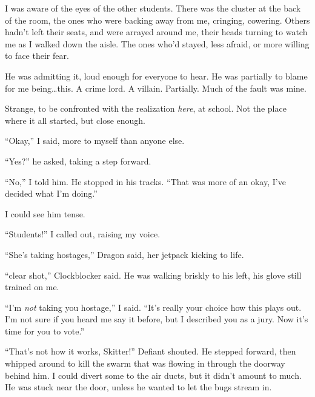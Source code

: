 I was aware of the eyes of the other students.  There was the cluster at the back of the room, the ones who were backing away from me, cringing, cowering.  Others hadn't left their seats, and were arrayed around me, their heads turning to watch me as I walked down the aisle.  The ones who'd stayed, less afraid, or more willing to face their fear.



He was admitting it, loud enough for everyone to hear.  He was partially to blame for me being\ldots this.  A crime lord.  A villain.  Partially.  Much of the fault was mine.



Strange, to be confronted with the realization \emph{here}, at school.  Not the place where it all started, but close enough.



``Okay,'' I said, more to myself than anyone else.



``Yes?'' he asked, taking a step forward.



``No,'' I told him.  He stopped in his tracks.  ``That was more of an okay, I've decided what I'm doing.''



I could see him tense.



``Students!'' I called out, raising my voice.



``She's taking hostages,'' Dragon said, her jetpack kicking to life.



``\ldotsa clear shot,'' Clockblocker said.  He was walking briskly to his left, his glove still trained on me.



``I'm \emph{not} taking you hostage,'' I said.  ``It's really your choice how this plays out.  I'm not sure if you heard me say it before, but I described you as a jury.  Now it's time for you to vote.''



``That's not how it works, Skitter!'' Defiant shouted.  He stepped forward, then whipped around to kill the swarm that was flowing in through the doorway behind him.  I could divert some to the air ducts, but it didn't amount to much.  He was stuck near the door, unless he wanted to let the bugs stream in.



